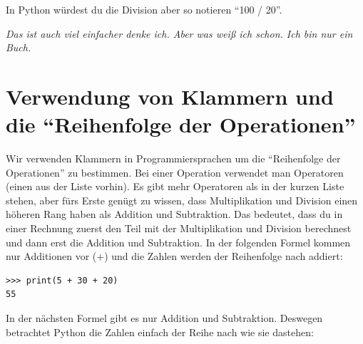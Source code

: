In Python würdest du die Division aber so notieren ``100 / 20''.

\emph{Das ist auch viel einfacher denke ich. Aber was weiß ich schon. Ich bin nur ein Buch.}

\section{Verwendung von Klammern und die ``Reihenfolge der Operationen''}

Wir verwenden Klammern in Programmiersprachen um die ``Reihenfolge der Operationen'' zu bestimmen. Bei einer Operation verwendet man Operatoren (einen aus der Liste vorhin). Es gibt mehr Operatoren als in der kurzen Liste stehen, aber fürs Erste genügt zu wissen, dass Multiplikation und Division einen höheren Rang haben als Addition und Subtraktion. Das bedeutet, dass du in einer Rechnung zuerst den Teil mit der Multiplikation und Division berechnest und dann erst die Addition und Subtraktion. In der folgenden Formel kommen nur Additionen vor (+) und die Zahlen werden der Reihenfolge nach addiert:

\begin{Verbatim}[frame=single]
>>> print(5 + 30 + 20)
55
\end{Verbatim}

\noindent
In der nächsten Formel gibt es nur Addition und Subtraktion. Deswegen betrachtet Python die Zahlen einfach der Reihe nach wie sie dastehen:

